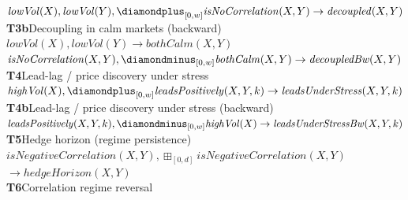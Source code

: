 \begin{figure}[t]
{\begin{minipage}{0.95\textwidth}
\hspace*{1.5em}\mbox{$\mathit{lowVol}(X), \mathit{lowVol}(Y), \diamondplus_{[0,w]} \mathit{isNoCorrelation}(X,Y) \to \mathit{decoupled}(X,Y)$}\\[5pt]
\textbf{T3b}\quad Decoupling in calm markets (backward)~\cite{ang2002asymmetric}\hspace{1em plus 1fill}{\footnotesize (fitted constants: $w$)}\\
\hspace*{1.5em}\mbox{$\mathit{lowVol}(X), \mathit{lowVol}(Y) \to \mathit{bothCalm}(X,Y)$}\\
\hspace*{1.5em}\mbox{$\mathit{isNoCorrelation}(X,Y), \diamondminus_{[0,w]} \mathit{bothCalm}(X,Y) \to \mathit{decoupledBw}(X,Y)$}\\[5pt]
\textbf{T4}\quad Lead-lag / price discovery under stress~\cite{hasbrouck1995onesecurity,dejong1997highfrequency}\hspace{1em plus 1fill}{\footnotesize (fitted constants: $w$, $k$)}\\
\hspace*{1.5em}\mbox{$\mathit{highVol}(X), \diamondplus_{[0,w]} \mathit{leadsPositively}(X,Y,k) \to \mathit{leadsUnderStress}(X,Y,k)$}\\[5pt]
\textbf{T4b}\quad Lead-lag / price discovery under stress (backward)~\cite{hasbrouck1995onesecurity,dejong1997highfrequency}\hspace{1em plus 1fill}{\footnotesize (fitted constants: $w$, $k$)}\\
\hspace*{1.5em}\mbox{$\mathit{leadsPositively}(X,Y,k), \diamondminus_{[0,w]} \mathit{highVol}(X) \to \mathit{leadsUnderStressBw}(X,Y,k)$}\\[5pt]
\textbf{T5}\quad Hedge horizon (regime persistence)~\cite{baur2010hedge}\hspace{1em plus 1fill}{\footnotesize (fitted constants: $d$)}\\
\hspace*{1.5em}\mbox{$\mathit{isNegativeCorrelation}(X,Y), \boxplus_{[0,d]} \mathit{isNegativeCorrelation}(X,Y)$}\\
\hspace*{1.5em}\hspace*{3em}\mbox{$\to \mathit{hedgeHorizon}(X,Y)$}\\[5pt]
\textbf{T6}\quad Correlation regime reversal~\cite{ang2002regimeshifts}\\

\end{minipage}}
\end{figure}
